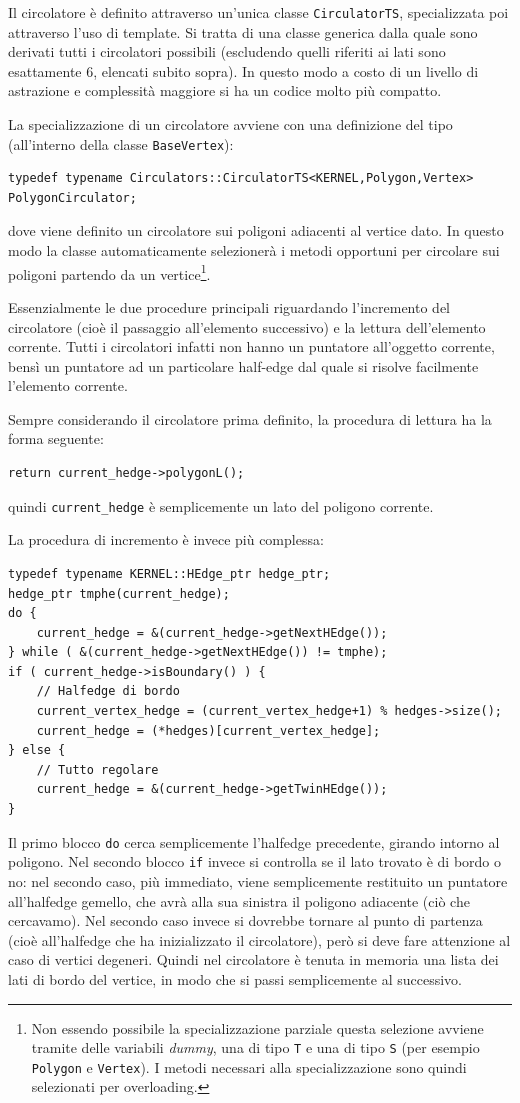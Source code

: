 Il circolatore è definito attraverso un'unica classe \texttt{CirculatorTS}, specializzata poi attraverso l'uso di template. Si tratta di una classe generica dalla quale sono derivati tutti i circolatori possibili (escludendo quelli riferiti ai lati sono esattamente 6, elencati subito sopra). In questo modo a costo di un livello di astrazione e complessità maggiore si ha un codice molto più compatto.

La specializzazione di un circolatore avviene con una definizione del tipo (all'interno della classe \texttt{BaseVertex}):
\begin{lstlisting}
typedef typename Circulators::CirculatorTS<KERNEL,Polygon,Vertex>  PolygonCirculator;
\end{lstlisting}
dove viene definito un circolatore sui poligoni adiacenti al vertice dato. In questo modo la classe automaticamente selezionerà i metodi opportuni per circolare sui poligoni partendo da un vertice\footnote{Non essendo possibile la specializzazione parziale questa selezione avviene tramite delle variabili \emph{dummy}, una di tipo \texttt{T} e una di tipo \texttt{S} (per esempio \texttt{Polygon} e \texttt{Vertex}). I metodi necessari alla specializzazione sono quindi selezionati per overloading.}.

Essenzialmente le due procedure principali riguardando l'incremento del circolatore (cioè il passaggio all'elemento successivo) e la lettura dell'elemento corrente. Tutti i circolatori infatti non hanno un puntatore all'oggetto corrente, bensì un puntatore ad un particolare half-edge dal quale si risolve facilmente l'elemento corrente.

Sempre considerando il circolatore prima definito, la procedura di lettura ha la forma seguente:
\begin{lstlisting}
return current_hedge->polygonL();
\end{lstlisting}
quindi \texttt{current\_hedge} è semplicemente un lato del poligono corrente.

La procedura di incremento è invece più complessa:
\begin{lstlisting}
typedef typename KERNEL::HEdge_ptr hedge_ptr;
hedge_ptr tmphe(current_hedge);
do {
    current_hedge = &(current_hedge->getNextHEdge());
} while ( &(current_hedge->getNextHEdge()) != tmphe);
if ( current_hedge->isBoundary() ) {
    // Halfedge di bordo
    current_vertex_hedge = (current_vertex_hedge+1) % hedges->size();
    current_hedge = (*hedges)[current_vertex_hedge];
} else {
    // Tutto regolare
    current_hedge = &(current_hedge->getTwinHEdge());
}
\end{lstlisting}
Il primo blocco \texttt{do} cerca semplicemente l'halfedge precedente, girando intorno al poligono. Nel secondo blocco \texttt{if} invece si controlla se il lato trovato è di bordo o no: nel secondo caso, più immediato, viene semplicemente restituito un puntatore all'halfedge gemello, che avrà alla sua sinistra il poligono adiacente (ciò che cercavamo). Nel secondo caso invece si dovrebbe tornare al punto di partenza (cioè all'halfedge che ha inizializzato il circolatore), però si deve fare attenzione al caso di vertici degeneri. Quindi nel circolatore è tenuta in memoria una lista dei lati di bordo del vertice, in modo che si passi semplicemente al successivo.
 

